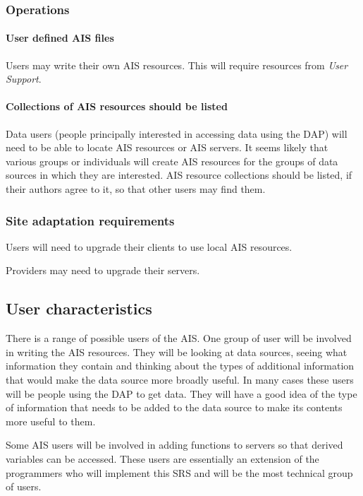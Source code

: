 \documentclass{article}
\begin{document}
\subsubsection{Operations}
\paragraph{User defined \ac{AIS} files} 
Users may write their own \ac{AIS} resources. This will require resources from
\emph{User Support}.

\paragraph{Collections of \ac{AIS} resources should be listed}
Data users (people principally interested in accessing data using the
\ac{DAP}) will need to be able to locate \ac{AIS} resources or \ac{AIS}
servers. It seems likely that various groups or individuals will create
\ac{AIS} resources for the groups of data sources in which they are
interested. \acl{AIS} resource collections should be listed, if their
authors agree to it, so that other users may find them.

\subsubsection{Site adaptation requirements}
Users will need to upgrade their clients \cbstart to use local \ac{AIS}
resources. \cbend

Providers may need to upgrade their servers.

\subsection{User characteristics}
There is a range of possible users of the \ac{AIS}. One group of user will be
involved in writing the \ac{AIS} resources. They will be looking at data
sources, seeing what information they contain and thinking about the types of
additional information that would make the data source more broadly useful.
In many cases these users will be people using the \ac{DAP} to get data. They
will have a good idea of the type of information that needs to be added to
the data source to make its contents more useful to them. 

Some \ac{AIS} users will be involved in adding functions to servers so that
derived variables can be accessed. These users are essentially an extension
of the programmers who will implement this SRS and will be the most technical
group of users.
\end{document}
